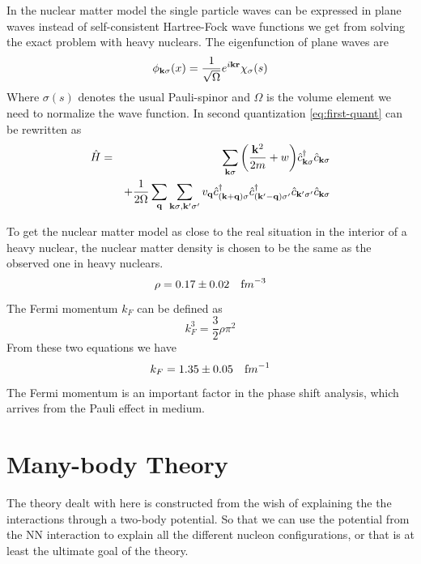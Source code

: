 In the nuclear matter model the single particle waves can be expressed in plane waves instead of self-consistent Hartree-Fock wave
functions we get from solving the exact problem with heavy nuclears.
The eigenfunction of plane waves are
\begin{equation}
\phi_{{\bf {k}}\sigma}(x)=\frac{1}{\sqrt{\Omega}}e^{i{\bf {kr}}}\chi_\sigma(s)
\end{equation}
Where $\sigma(s)$ denotes the usual Pauli-spinor and $\Omega$ is the volume element we need to normalize the wave function.
In second quantization \ref{eq:first-quant} can be rewritten
as
\begin{eqnarray}\label{eq:seceond-quant}
\op{H}&=&\sum_{{{\bf {k}}\sigma}}\bigg(\frac{{\bf {k}}^2}{2m}+w\bigg)
\op{c}^\dagger_{{{\bf {k}}\sigma}}\op{c}_{{{\bf {k}}\sigma}}
\nonumber\\
      &&+\frac{1}{2\Omega}\sum_{{\bf {q}}}\sum_{{{\bf {k}}\sigma},{{\bf {k}}'\sigma'}}
      v_{{\bf {q}}}
      \op{c}^\dagger_{({{\bf {k}}+{{\bf {q}}})\sigma}}\op{c}^\dagger_{({{\bf {k}}'-{{\bf {q}}})\sigma'}}
      \op{c}_{{{\bf {k}}'\sigma'}} \op{c}_{{{\bf {k}}\sigma}} 
\end{eqnarray}

To get the nuclear matter model as close to the real situation in the interior of a heavy nuclear, the nuclear matter density
is chosen to be the same as the observed one in heavy nuclears.
\begin{equation}
\rho=0.17\pm 0.02\quad {\text fm}^{-3}
\end{equation}
The Fermi momentum $k_F$ can be defined as
\begin{equation}
k^3_F=\frac{3}{2}\rho\pi^2
\end{equation}
From these two equations we have
\begin{equation}
k_F=1.35\pm0.05\quad {\text fm}^{-1}
\end{equation}
The Fermi momentum is an important factor in the phase shift analysis, which arrives from the Pauli effect in medium.









\section{Many-body Theory}
The theory dealt with here is constructed from the wish of explaining the the interactions through a
two-body potential. So that we can use the potential from the NN interaction to explain all the different nucleon configurations, 
or that is at least the ultimate goal of the theory.

